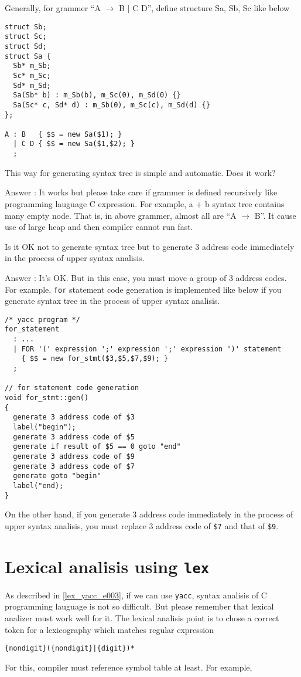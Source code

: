 \begin{QandA}
Generally, for grammer ``A $\rightarrow$ B $|$ C D'', define
structure Sa, Sb, Sc like below
\begin{verbatim}
struct Sb;
struct Sc;
struct Sd;
struct Sa {
  Sb* m_Sb;
  Sc* m_Sc;
  Sd* m_Sd;
  Sa(Sb* b) : m_Sb(b), m_Sc(0), m_Sd(0) {}
  Sa(Sc* c, Sd* d) : m_Sb(0), m_Sc(c), m_Sd(d) {}
};

A : B   { $$ = new Sa($1); }
  | C D { $$ = new Sa($1,$2); }
  ;
\end{verbatim}
This way for generating syntax tree is simple and automatic.
Does it work?

Answer : It works but please take care if grammer is defined
recursively like programming lauguage C expression. For example,
a + b syntax tree contains many empty node. That is, in above
grammer, almost all are ``A $\rightarrow$ B''.
It cause use of large heap and then compiler cannot run fast.
\end{QandA}

\begin{QandA}
\label{lex_yacc_e001}
Is it OK not to generate syntax tree but to generate 3 address
code immediately in the process of upper syntax analisis.

Answer : It's OK. But in this case, you must move a 
group of 3 address codes. For example, {\tt{for}} statement
code generation is implemented like below if you generate
syntax tree in the process of upper syntax analisis.

\begin{verbatim}
/* yacc program */
for_statement
  : ...
  | FOR '(' expression ';' expression ';' expression ')' statement
    { $$ = new for_stmt($3,$5,$7,$9); }
  ;

// for statement code generation
void for_stmt::gen()
{
  generate 3 address code of $3
  label("begin");
  generate 3 address code of $5
  generate if result of $5 == 0 goto "end"
  generate 3 address code of $9
  generate 3 address code of $7
  generate goto "begin"
  label("end);
}
\end{verbatim}

On the other hand, if you generate 3 address code immediately in the
process of upper syntax analisis,
you must replace 3 address code of {\tt{\$7}}
and that of {\tt{\$9}}.
\end{QandA}

\section{Lexical analisis using {\tt{lex}}}
\label{lex_yacc_e004}
As described in \ref{lex_yacc_e003}, if we can use  {\tt{yacc}},
syntax analisis of C programming lauguage is not so difficult.
But please remember that lexical analizer must work well for it.
The lexical analisis point is to chose a correct token
for a lexicography which matches
regular expression
\begin{verbatim}
{nondigit}({nondigit}|{digit})*
\end{verbatim}
For this, compiler must reference symbol table at least. For example,

